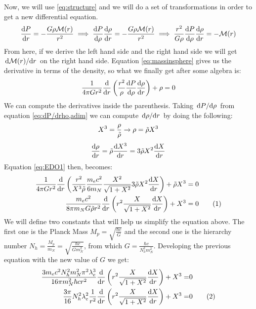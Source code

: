 \documentclass[a4paper]{article}
\newcommand\numberthis{\addtocounter{equation}{1}\tag{\theequation}}
\newcommand\M{\mathcal{M}}
\begin{document}
Now, we will use \eqref{eq:structure} and we will do a set of transformations in order to get a new differential equation.
\begin{equation}
    \odv{P}{r}=-\frac{G\rho\M(r)}{r^2} \implies \odv{P}{\rho}\odv{\rho}{r}=-\frac{G\rho\M(r)}{r^2} \implies \frac{r^2}{G\rho}\odv{P}{\rho}\odv{\rho}{r}=-\M(r)
\end{equation}
From here, if we derive the left hand side and the right hand side we will get $\odv{\M(r)}/{r}$ on the right hand side. Equation \eqref{eq:massinsphere} gives us the derivative in terms of the density, so what we finally get after some algebra is:
\begin{equation}\label{eq:EDO1}
    \frac{1}{4\pi Gr^2}\odv*{\left(\frac{r^2}{\rho}\odv{P}{\rho}\odv{\rho}{r}\right)}{r}+\rho=0
\end{equation}
We can compute the derivatives inside the parenthesis. Taking $\odv{P}/{\rho}$ from equation \eqref{eq:dP/drho,adim} we can compute $\odv{\rho}/{r}$ by doing the following:
\begin{equation}
    X^3=\frac{\rho}{\Tilde{\rho}}\rightarrow\rho={\Tilde{\rho}}X^3
\end{equation}
\begin{equation}
    \odv{\rho}{r}={\Tilde{\rho}}\odv{X^3}{r}=3{\Tilde{\rho}}X^2\odv{X}{r}
\end{equation}
Equation \eqref{eq:EDO1} then, becomes:
\begin{align*}
    \frac{1}{4\pi Gr^2}\odv*{\left(\frac{r^2}{X^3\Tilde{\rho}}\frac{m_ec^2}{6m_N}\frac{X^2}{\sqrt{1+X^2}}3{\Tilde{\rho}}X^2\odv{X}{r}\right)}{r}+\tilde{\rho}X^3&=0 \\
    \frac{m_ec^2}{8\pi m_NG\Tilde{\rho}r^2}\odv*{\left(r^2\frac{X}{\sqrt{1+X^2}}\odv{X}{r}\right)}{r}+X^3&=0 \numberthis
\end{align*}
We will define two constants that will help us simplify the equation above. The first one is the Planck Mass $M_p=\sqrt{\frac{\hbar c}{G}}$ and the second one is the hierarchy number $N_h=\frac{M_p}{m_N}=\sqrt{\frac{\hbar c}{Gm_N^2}}$, from which $G=\frac{\hbar c}{N_h^2m_N^2}$. Developing the previous equation with the new value of $G$ we get:
\begin{align*}\label{eq:EDO2}
    \frac{3m_ec^2N_h^2m_N^2\pi^2\lambda_e^3}{16\pi m_N^2\hbar cr^2}\odv*{\left(r^2\frac{X}{\sqrt{1+X^2}}\odv{X}{r}\right)}{r}+X^3=&0\\
    \frac{3\pi}{16}N_h^2\lambda_e^2\frac{1}{r^2}\odv*{\left(r^2\frac{X}{\sqrt{1+X^2}}\odv{X}{r}\right)}{r}+X^3=&0 \numberthis
\end{align*}
\end{document}
